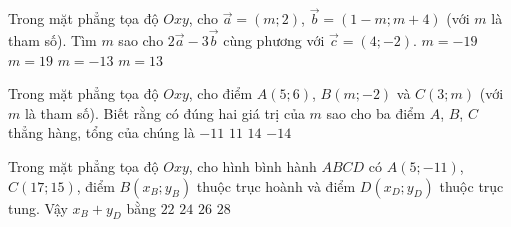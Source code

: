 \begin{ex}%
	Trong mặt phẳng tọa độ $Oxy$, cho $\vec{a}=(m;2)$, $\vec{b}=(1-m;m+4)$ (với $m$ là tham số). Tìm $m$ sao cho $2\vec{a}-3\vec{b}$ cùng phương với $\vec{c}=(4;-2)$.
	\choice
	{\True $m=-19$}
	{$m=19$}
	{$m=-13$}
	{$m=13$}
\end{ex}

\begin{ex}%
	Trong mặt phẳng tọa độ $Oxy$, cho điểm $A(5;6)$, $B(m;-2)$ và $C(3;m)$ (với $m$ là tham số). Biết rằng có đúng hai giá trị của $m$ sao cho ba điểm $A$, $B$, $C$ thẳng hàng, tổng của chúng là
	\choice
	{$-11$}
	{\True $11$}
	{$14$}
	{$-14$}
\end{ex}

\begin{ex}%
	Trong mặt phẳng tọa độ $Oxy$, cho hình bình hành $ABCD$ có $A(5;-11)$, $C(17;15)$, điểm $B(x_B;y_B)$ thuộc trục hoành và điểm $D(x_D;y_D)$ thuộc trục tung. Vậy $x_B+y_D$ bằng
	\choice
	{$22$}
	{$24$}
	{\True $26$}
	{$28$}
\end{ex}

